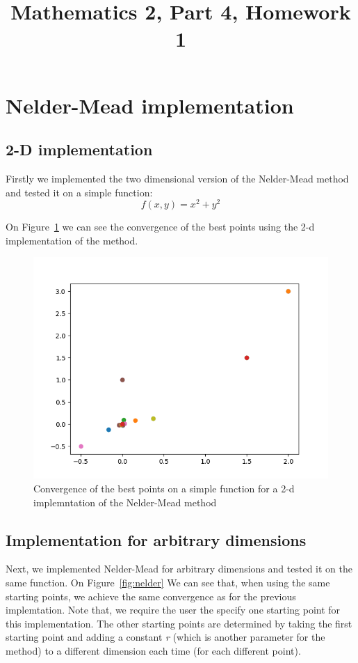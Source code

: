 \documentclass[9pt]{IEEEtran}
\title{\vspace{0ex}
Mathematics 2, Part 4, Homework 1}
\begin{document}
\maketitle
\section{Nelder-Mead implementation}
\subsection*{2-D implementation}
Firstly we implemented the two dimensional version of the Nelder-Mead method
 and tested it on a simple function: 
 \[f(x, y) = x^2 + y^2 \]

 On Figure~\ref{fig:nelder_2d} we can see the convergence of the best points using 
 the 2-d implementation of the method. 

\begin{figure}[h]
    \includegraphics[width=\columnwidth]{convergence1.png}
    \caption{Convergence of the best points on a simple function for a 2-d implemntation 
    of the Nelder-Mead method}
    \label{fig:nelder_2d}
\end{figure}

\subsection*{Implementation for arbitrary dimensions}
Next, we implemented Nelder-Mead for arbitrary dimensions and tested it on the 
same function. On Figure~\ref{fig:nelder} We can see that, when using the same starting points, we achieve 
the same convergence as for the previous implemtation. Note that, we require the
 user the specify one starting point for this implementation. The other starting 
 points are determined by taking the first starting point and adding a constant \textit{r}
 (which is another parameter for the method) to a different dimension each time (for each 
 different point). 
\end{document}

